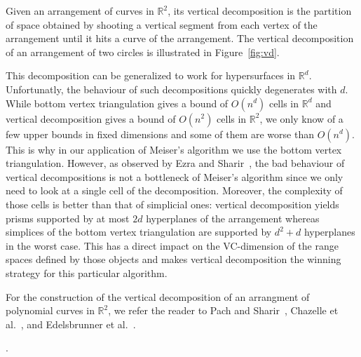 Given an arrangement of curves in \(\mathbb{R}^2\), its vertical decomposition
is the partition of space obtained by shooting a vertical segment from each
vertex of the arrangement until it hits a curve of the arrangement. The
vertical decomposition of an arrangement of two circles is illustrated
in Figure~\ref{fig:vd}.

This decomposition can be generalized to work for hypersurfaces in
\(\mathbb{R}^d\). Unfortunatly, the behaviour of such decompositions quickly
degenerates with \(d\).
While bottom vertex triangulation gives a bound of \(O(n^d)\) cells in
\(\mathbb{R}^d\) and
vertical decomposition gives a bound of \(O(n^2)\) cells in \(\mathbb{R}^2\),
we only know of a few upper bounds in fixed dimensions and some of them are
worse than \(O(n^d)\). This is why in our application of Meiser's algorithm we
use the bottom vertex triangulation. However, as observed by Ezra and
Sharir~\cite{ES17}, the bad behaviour of vertical decompositions is not a
bottleneck of Meiser's algorithm since we only need to look at a single cell of
the decomposition. Moreover, the complexity of those cells is better than that
of simplicial ones: vertical decomposition yields prisms supported by at most
\(2d\) hyperplanes of the arrangement whereas simplices of
the bottom vertex triangulation are supported by \(d^2 + d\) hyperplanes in the
worst case. This has a direct impact on the VC-dimension of the range spaces
defined by those objects and makes vertical decomposition the winning strategy
for this particular algorithm.

For the construction of the vertical decomposition of an arrangment of
polynomial curves in \(\mathbb{R}^2\),
we refer the reader to Pach and Sharir~\cite{Alcala}, Chazelle et
al.~\cite{CEGS91}, and Edelsbrunner et al.~\cite{EGPPSS92}.

.
